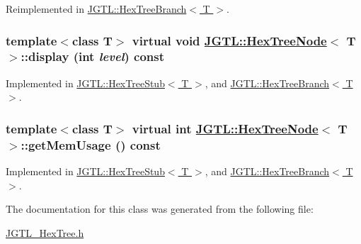 Reimplemented in \hyperlink{class_j_g_t_l_1_1_hex_tree_branch_d89e805f2da424578087d92b0be7e35e}{JGTL::Hex\-Tree\-Branch$<$ T $>$}.\hypertarget{class_j_g_t_l_1_1_hex_tree_node_2031e26f8fbf11d061e51cdd0a6c27eb}{
\subsubsection[display]{\setlength{\rightskip}{0pt plus 5cm}template$<$class T$>$ virtual void \hyperlink{class_j_g_t_l_1_1_hex_tree_node}{JGTL::Hex\-Tree\-Node}$<$ T $>$::display (int {\em level}) const}}
\label{class_j_g_t_l_1_1_hex_tree_node_2031e26f8fbf11d061e51cdd0a6c27eb}




Implemented in \hyperlink{class_j_g_t_l_1_1_hex_tree_stub_aa4a8e4efcf4afe347e9e0bf7d5d32ba}{JGTL::Hex\-Tree\-Stub$<$ T $>$}, and \hyperlink{class_j_g_t_l_1_1_hex_tree_branch_b9ca243a3f04629750ee65544b14e548}{JGTL::Hex\-Tree\-Branch$<$ T $>$}.\hypertarget{class_j_g_t_l_1_1_hex_tree_node_9d71c1520ef1d80cf8ff292710e1994d}{
\subsubsection[getMemUsage]{\setlength{\rightskip}{0pt plus 5cm}template$<$class T$>$ virtual int \hyperlink{class_j_g_t_l_1_1_hex_tree_node}{JGTL::Hex\-Tree\-Node}$<$ T $>$::get\-Mem\-Usage () const}}
\label{class_j_g_t_l_1_1_hex_tree_node_9d71c1520ef1d80cf8ff292710e1994d}




Implemented in \hyperlink{class_j_g_t_l_1_1_hex_tree_stub_51ad9d73122cd1c356c1b8219941a6e7}{JGTL::Hex\-Tree\-Stub$<$ T $>$}, and \hyperlink{class_j_g_t_l_1_1_hex_tree_branch_84bea1c135b12ec017dfa3c701d0f9c9}{JGTL::Hex\-Tree\-Branch$<$ T $>$}.

The documentation for this class was generated from the following file:\begin{CompactItemize}
\item 
\hyperlink{_j_g_t_l___hex_tree_8h}{JGTL\_\-Hex\-Tree.h}\end{CompactItemize}
